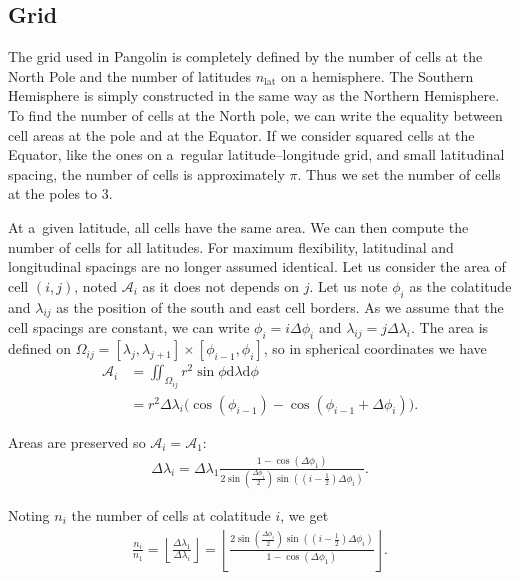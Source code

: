 \subsection{Grid}
    \label{subsec:grid}


    The grid used in Pangolin is completely defined by the number of
    cells at the North Pole and the number of latitudes
    $n_{\text{lat}}$ on a hemisphere. The Southern Hemisphere is
    simply constructed in the same way as the Northern Hemisphere. To
    find the number of cells at the North pole, we can write the equality
    between cell areas at the pole and at the Equator. If we consider
    squared cells at the Equator, like the ones on a~regular
    latitude--longitude grid, and small latitudinal spacing, the number
    of cells is approximately $\pi$. Thus we set the number of cells
    at the poles to 3.



    At a~given latitude, all cells have the same area. We can then
    compute the number of cells for all latitudes. For
    maximum flexibility, latitudinal and longitudinal spacings are no longer assumed identical. Let us consider the area of cell $(i,j)$,
    noted $\mathcal{A}_{i}$ as it does not depends on $j$. Let us note
    $\phi_i$ as the colatitude and $\lambda_{ij}$ as the position of the
    south and east cell borders. As we assume that the cell spacings are
    constant, we can write $\phi_i =i\Delta\phi_i$ and
    $\lambda_{ij}=j\Delta\lambda_i$.  The area is defined on
    $\Omega_{ij} = [\lambda_j, \lambda_{j+1}]\times
    [\phi_{i-1},\phi_i]$, so in spherical coordinates we have
\begin{align}
\mathcal{A}_{i} &= \iint_{\Omega_{ij}}  r^2 \sin\phi \mathrm{d}\lambda \mathrm{d}\phi \nonumber\\
  &= r^2 \Delta\lambda_i \big (\cos(\phi_{i-1}) - \cos(\phi_{i-1}+\Delta\phi_i)\big).
\label{eqn:cell_area}
   \end{align}

   Areas are preserved so $\mathcal{A}_i=\mathcal{A}_1$:
\begin{align*} \Delta\lambda_i  = \Delta\lambda_1 \frac {1-\cos(\Delta\phi_1)}
{2\sin\left( \frac{\Delta\phi_i}{2} \right) \sin\left(\left(i-\frac{1}{2}\right)\Delta\phi_i\right)}.
   \end{align*}

   Noting $n_i$ the number of cells at colatitude $i$, we get
\begin{align*} \frac{n_i}{n_1} = \left\lfloor \frac{\Delta\lambda_1}{\Delta\lambda_i} \right\rfloor=
\left\lfloor \frac {2\sin\left( \frac{\Delta\phi_i}{2} \right) \sin\left(\left(i-\frac{1}{2}\right)\Delta\phi_i\right)}%
{1-\cos(\Delta\phi_1)}\right\rfloor.
   \end{align*}

